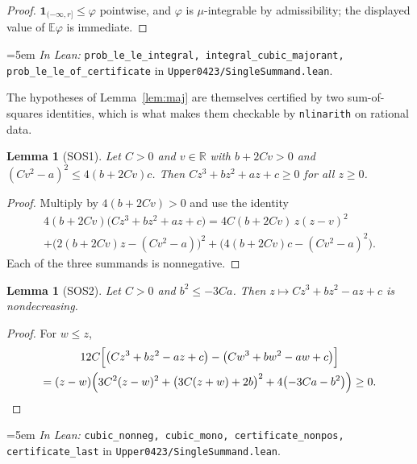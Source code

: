 \documentclass[11pt,a4paper]{article}
\newtheorem{lemma}[theorem]{Lemma}
\theoremstyle{definition}
\newcommand{\RR}{\mathbb{R}}
\newcommand{\EE}{\mathbb{E}}
\newcommand{\Lean}[1]{\texttt{#1}}
\newcommand{\file}[1]{\texttt{#1}}
\newcommand{\formal}[2]{%
  \par\smallskip
  \begingroup\small\raggedright\emergencystretch=5em
  \noindent\textit{In Lean:} \Lean{#1} in \file{#2}.\par
  \endgroup\smallskip}
\begin{document}
\begin{proof}
  $\mathbf 1_{(-\infty,r]}\le\varphi$ pointwise, and $\varphi$ is $\mu$-integrable
  by admissibility; the displayed value of $\EE\varphi$ is immediate.
\end{proof}
\formal{prob\_le\_le\_integral, integral\_cubic\_majorant, prob\_le\_le\_of\_certificate}{Upper0423/SingleSummand.lean}

The hypotheses of Lemma~\ref{lem:maj} are themselves certified by two
sum-of-squares identities, which is what makes them checkable by \Lean{nlinarith}
on rational data.

\begin{lemma}[SOS1]
  \label{lem:sos1}
  Let $C>0$ and $v\in\RR$ with $b+2Cv>0$ and
  $(Cv^2-a)^2\le4(b+2Cv)c$. Then $Cz^3+bz^2+az+c\ge0$ for all $z\ge0$.
\end{lemma}
\begin{proof}
  Multiply by $4(b+2Cv)>0$ and use the identity
  \begin{multline*}
    4(b+2Cv)\bigl(Cz^3+bz^2+az+c\bigr)
    =4C(b+2Cv)\,z(z-v)^2\\
    +\bigl(2(b+2Cv)z-(Cv^2-a)\bigr)^2
    +\bigl(4(b+2Cv)c-(Cv^2-a)^2\bigr) .
  \end{multline*}
  Each of the three summands is nonnegative.
\end{proof}

\begin{lemma}[SOS2]
  \label{lem:sos2}
  Let $C>0$ and $b^2\le-3Ca$. Then $z\mapsto Cz^3+bz^2-az+c$ is nondecreasing.
\end{lemma}
\begin{proof}
  For $w\le z$,
  \begin{multline*}
    12C\Bigl[\bigl(Cz^3+bz^2-az+c\bigr)-\bigl(Cw^3+bw^2-aw+c\bigr)\Bigr]\\
    =(z-w)\Bigl(3C^2(z-w)^2+\bigl(3C(z+w)+2b\bigr)^2+4\bigl(-3Ca-b^2\bigr)\Bigr)\ge0 .
  \end{multline*}
\end{proof}
\formal{cubic\_nonneg, cubic\_mono, certificate\_nonpos, certificate\_last}{Upper0423/SingleSummand.lean}
\end{document}
